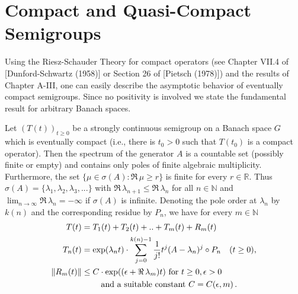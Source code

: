 \section{Compact and Quasi-Compact Semigroups}

Using the Riesz-Schauder Theory for compact operators (see \eg
Chapter VII.4 of [Dunford-Schwartz (1958)] or Section 26 of [Pietsch
(1978)]) and the results of Chapter A-III, one can easily describe the
asymptotic behavior of eventually compact semigroups.
Since no positivity is involved we state the fundamental result for arbitrary Banach
spaces.

\begin{theorem}\label{thm:b4-2.1}
	Let $(T(t))_{t \geq 0}$ be a strongly continuous semigroup on a
	Banach space $G$ which is eventually compact (i.e., there is $t_{0} > 0$
	such that $T(t_{0})$ is a compact operator).
	Then the spectrum of the
	generator $A$ is a countable set (possibly finite or empty) and
	contains only poles of finite algebraic multiplicity.
	Furthermore,
	the set $\{\mu \in \sigma(A) \colon \Re\,\mu \geq r\}$ is finite for every $r \in \mathbb{R}$.
	Thus
	$\sigma(A) = \{\lambda_1,\lambda_2,\lambda_3,... \}$ with $\Re\,\lambda_{n+1} \leq \Re\,\lambda_n$ for all $n \in \mathbb{N}$ and
	$\lim_{n \to \infty} \Re\,\lambda_n = -\infty$ if $\sigma(A)$ is infinite.
	Denoting the pole order at $\lambda_n$ by $k(n)$ and the corresponding residue
	by $P_n$, we have for every $m \in \mathbb{N}$
	\begin{equation}\label{eq:b4-2.1}
		\begin{aligned}
			T(t) &= T_1(t) + T_2(t) + .. + T_m(t) + R_m(t)\\
			T_n(t) &= \exp(\lambda_n t) \cdot \sum_{j=0}^{k(n)-1} \frac{1}{j!}t^j(A - \lambda_n)^j \circ P_n \quad (t \geq 0),\\
			\|R_m(t)\| & \leq C \cdot \exp((\epsilon +\Re\, \lambda_m)t) \text{ for }  t \geq 0, \epsilon >0\\
			& \text{\phantom{aaaa} and a suitable	constant } C=C(\epsilon ,m)\,.
		\end{aligned}
	\end{equation}
\end{theorem}

